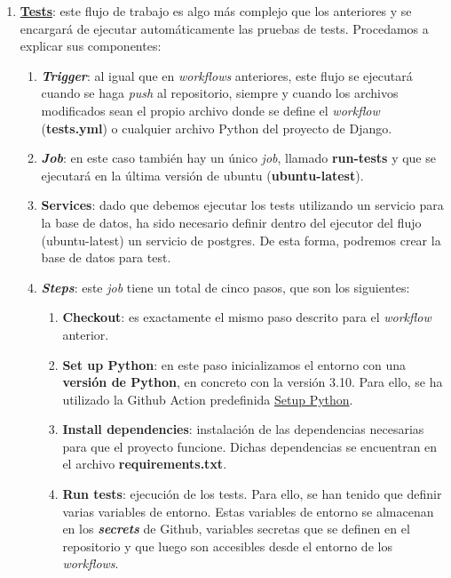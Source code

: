 \begin{enumerate}
        \item \textbf{\href{https://github.com/alexespana/TFG/actions/workflows/tests.yml}
        {Tests}}: este flujo de trabajo es algo más complejo que los anteriores y se encargará
        de ejecutar automáticamente las pruebas de tests. Procedamos a explicar sus componentes:
            \begin{enumerate}
                \item \textbf{\textit{Trigger}}: al igual que en \textit{workflows}
                anteriores, este flujo se ejecutará cuando se haga \textit{push} al
                repositorio, siempre y cuando los archivos modificados sean el propio
                archivo donde se define el \textit{workflow} (\textbf{tests.yml}) o
                cualquier archivo Python del proyecto de Django.
                \item \textbf{\textit{Job}}: en este caso también hay un único \textit{job},
                llamado \textbf{run-tests} y que se ejecutará en la última versión de
                ubuntu (\textbf{ubuntu-latest}).
                \item \textbf{Services}: dado que debemos ejecutar los tests utilizando un
                servicio para la base de datos, ha sido necesario definir dentro del ejecutor
                del flujo (ubuntu-latest) un servicio de postgres. De esta forma,
                podremos crear la base de datos para test.              
                \item \textbf{\textit{Steps}}: este \textit{job} tiene un total de cinco
                pasos, que son los siguientes:
                    \begin{enumerate}
                        \item \textbf{Checkout}: es exactamente el mismo paso descrito para
                        el \textit{workflow} anterior.
                        \item \textbf{Set up Python}: en este paso inicializamos el entorno
                        con una \textbf{versión de Python}, en concreto con la versión 3.10.
                        Para ello, se ha utilizado la Github Action predefinida
                        \href{https://github.com/marketplace/actions/setup-python}{Setup
                        Python}.
                        \item \textbf{Install dependencies}: instalación de las dependencias
                        necesarias para que el proyecto funcione. Dichas dependencias se
                        encuentran en el archivo \textbf{requirements.txt}.
                        \item \textbf{Run tests}: ejecución de los tests. Para ello, se han
                        tenido que definir varias variables de entorno. Estas variables de
                        entorno se almacenan en los \textbf{\textit{secrets}} de Github,
                        variables secretas que se definen en el repositorio y que luego son
                        accesibles desde el entorno de los \textit{workflows}.\\
                        

\end{enumerate}
\end{enumerate}
\end{enumerate}
